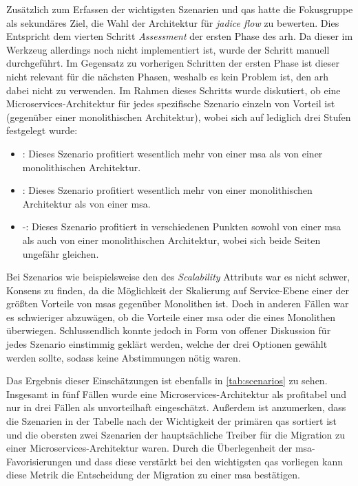 Zusätzlich zum Erfassen der wichtigsten Szenarien und \glspl{qa} hatte die Fokusgruppe als sekundäres Ziel, die Wahl der Architektur für \emph{jadice flow} zu bewerten. 
Dies Entspricht dem vierten Schritt \emph{Assessment} der ersten Phase des \gls{arh}.
Da dieser im Werkzeug allerdings noch nicht implementiert ist, wurde der Schritt manuell durchgeführt.
Im Gegensatz zu vorherigen Schritten der ersten Phase ist dieser nicht relevant für die nächsten Phasen, weshalb es kein Problem ist, den \gls{arh} dabei nicht zu verwenden.
Im Rahmen dieses Schritts wurde diskutiert, ob eine Microservices-Architektur für jedes spezifische Szenario einzeln von Vorteil ist (gegenüber einer monolithischen Architektur), wobei sich auf lediglich drei Stufen festgelegt wurde:
\begin{itemize}
	\item \advantage\hspace*{0.1cm}: Dieses Szenario profitiert wesentlich mehr von einer \gls{msa} als von einer monolithischen Architektur.
	\item \disadvantage\hspace*{0.1cm}: Dieses Szenario profitiert wesentlich mehr von einer monolithischen Architektur als von einer \gls{msa}.
	\item \hspace*{0.27cm}-\hspace*{0.27cm}: Dieses Szenario profitiert in verschiedenen Punkten sowohl von einer \gls{msa} als auch von einer monolithischen Architektur, wobei sich beide Seiten ungefähr gleichen.
\end{itemize}
Bei Szenarios wie beispielsweise den des \emph{Scalability} Attributs war es nicht schwer, Konsens zu finden, da die Möglichkeit der Skalierung auf Service-Ebene einer der größten Vorteile von \glspl{msa} gegenüber Monolithen ist.
Doch in anderen Fällen war es schwieriger abzuwägen, ob die Vorteile einer \gls{msa} oder die eines Monolithen überwiegen.
Schlussendlich konnte jedoch in Form von offener  Diskussion für jedes Szenario einstimmig geklärt werden, welche der drei Optionen gewählt werden sollte, sodass keine Abstimmungen nötig waren.

Das Ergebnis dieser Einschätzungen ist ebenfalls in \cref{tab:scenarios} zu sehen.
Insgesamt in fünf Fällen wurde eine Microservices-Architektur als profitabel und nur in drei Fällen als unvorteilhaft eingeschätzt. 
Außerdem ist anzumerken, dass die Szenarien in der Tabelle nach der Wichtigkeit der primären \glspl{qa} sortiert ist und die obersten zwei Szenarien der hauptsächliche Treiber für die Migration zu einer Microservices-Architektur waren.
Durch die Überlegenheit der \gls{msa}-Favorisierungen und dass diese verstärkt bei den wichtigsten \glspl{qa} vorliegen kann diese Metrik die Entscheidung der Migration zu einer \gls{msa} bestätigen.

